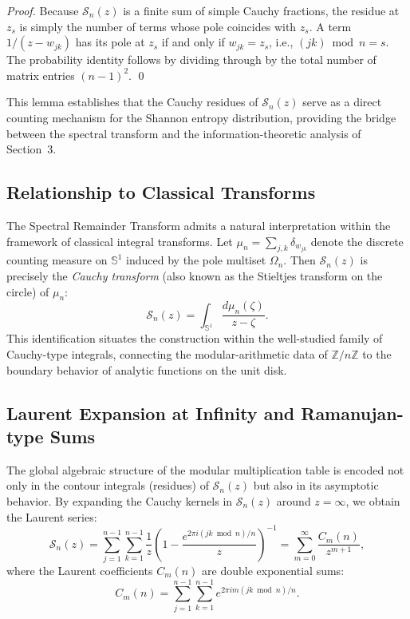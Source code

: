 \documentclass[11pt,twoside]{article}
\begin{document}
	\noindent\textit{Proof.} Because $\mathcal{S}_n(z)$ is a finite sum of simple Cauchy fractions, the residue at $z_s$ is simply the number of terms whose pole coincides with $z_s$. A term $1/(z - w_{jk})$ has its pole at $z_s$ if and only if $w_{jk} = z_s$, i.e., $(jk) \bmod n = s$. The probability identity follows by dividing through by the total number of matrix entries $(n-1)^2$. \qed
	
	This lemma establishes that the Cauchy residues of $\mathcal{S}_n(z)$ serve as a direct counting mechanism for the Shannon entropy distribution, providing the bridge between the spectral transform and the information-theoretic analysis of Section~3.
	
	\subsection{Relationship to Classical Transforms}
	The Spectral Remainder Transform admits a natural interpretation within the framework of classical integral transforms. Let $\mu_n = \sum_{j,k} \delta_{w_{jk}}$ denote the discrete counting measure on $\mathbb{S}^1$ induced by the pole multiset $\Omega_n$. Then $\mathcal{S}_n(z)$ is precisely the \emph{Cauchy transform} (also known as the Stieltjes transform on the circle) of $\mu_n$:
	\begin{equation}
		\mathcal{S}_n(z) = \int_{\mathbb{S}^1} \frac{d\mu_n(\zeta)}{z - \zeta}.
	\end{equation}
	This identification situates the construction within the well-studied family of Cauchy-type integrals, connecting the modular-arithmetic data of $\mathbb{Z}/n\mathbb{Z}$ to the boundary behavior of analytic functions on the unit disk.
	
	\subsection{Laurent Expansion at Infinity and Ramanujan-type Sums}
	The global algebraic structure of the modular multiplication table is encoded not only in the contour integrals (residues) of $\mathcal{S}_n(z)$ but also in its asymptotic behavior. By expanding the Cauchy kernels in $\mathcal{S}_n(z)$ around $z = \infty$, we obtain the Laurent series:
	\begin{equation}
		\mathcal{S}_n(z) = \sum_{j=1}^{n-1} \sum_{k=1}^{n-1} \frac{1}{z} \left( 1 - \frac{e^{2\pi i (jk \bmod n)/n}}{z} \right)^{-1} = \sum_{m=0}^{\infty} \frac{C_m(n)}{z^{m+1}},
	\end{equation}
	where the Laurent coefficients $C_m(n)$ are double exponential sums:
	\begin{equation}
		C_m(n) = \sum_{j=1}^{n-1} \sum_{k=1}^{n-1} e^{2\pi i m (jk \bmod n)/n}.
	\end{equation}
	
\end{document}
